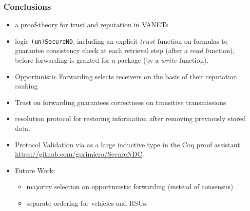 \documentclass{beamer}
\begin{document}
\begin{frame}
\label{conclusions}
\frametitle{Conclusions}
\smallskip

\begin{itemize}
\item a proof-theory for trust and reputation in VANETs
\item logic \texttt{(un)SecureND}, including an explicit $trust$ function on formulas to guarantee consistency check at each retrieval step (after a $read$ function), before forwarding is granted for a package (by a $write$ function).
\item Opportunistic Forwarding selects receivers on the basis of their reputation ranking
\item Trust on forwarding guarantees correctness on transitive transmissions
\item resolution protocol for restoring information after removing previously stored data.
\item Protocol Validation via as a large inductive type in the Coq proof assistant \url{https://github.com/gprimiero/SecureNDC}.

\item Future Work:
\begin{itemize}
\item majority selection on opportunistic forwarding (instead of consensus)
\item separate ordering for vehicles and RSUs.
\end{itemize}
\end{itemize}
\end{frame}
\end{document}
